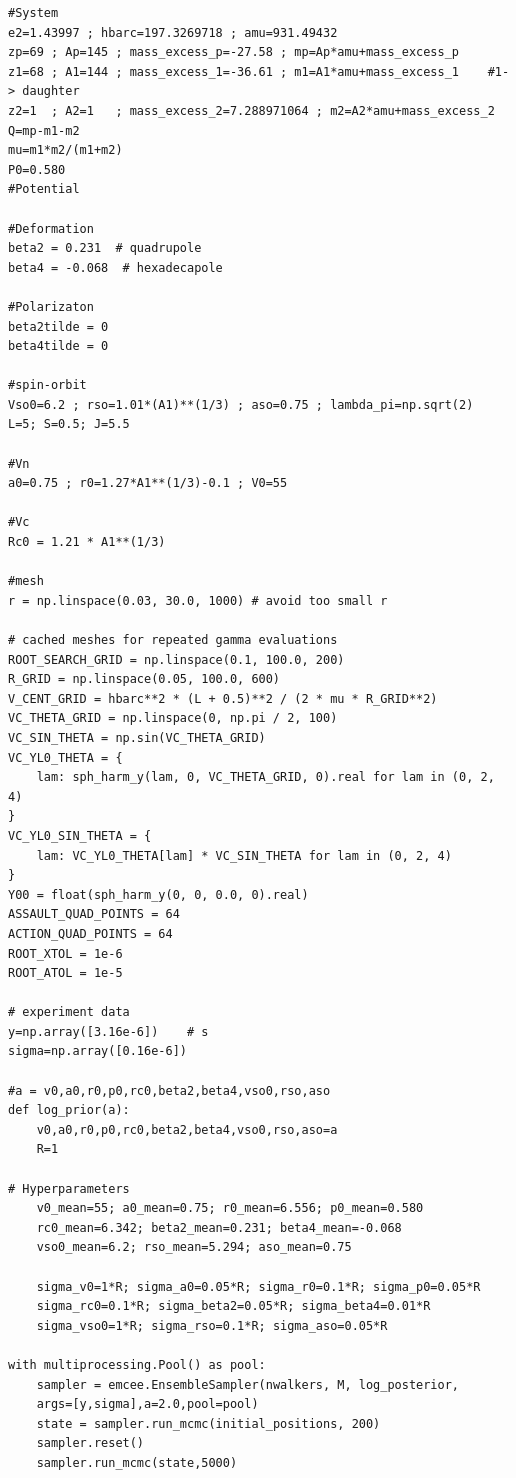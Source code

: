 \documentclass[11pt,a4paper,UTF8,scheme=plain,fontset=fandol]{ctexbook}
\theoremstyle{definition}
\theoremstyle{plain}
\theoremstyle{remark}
\begin{document}
\begin{verbatim}
#System
e2=1.43997 ; hbarc=197.3269718 ; amu=931.49432
zp=69 ; Ap=145 ; mass_excess_p=-27.58 ; mp=Ap*amu+mass_excess_p
z1=68 ; A1=144 ; mass_excess_1=-36.61 ; m1=A1*amu+mass_excess_1    #1-> daughter
z2=1  ; A2=1   ; mass_excess_2=7.288971064 ; m2=A2*amu+mass_excess_2
Q=mp-m1-m2
mu=m1*m2/(m1+m2)
P0=0.580
#Potential

#Deformation
beta2 = 0.231  # quadrupole
beta4 = -0.068  # hexadecapole 

#Polarizaton
beta2tilde = 0  
beta4tilde = 0

#spin-orbit
Vso0=6.2 ; rso=1.01*(A1)**(1/3) ; aso=0.75 ; lambda_pi=np.sqrt(2)
L=5; S=0.5; J=5.5

#Vn
a0=0.75 ; r0=1.27*A1**(1/3)-0.1 ; V0=55

#Vc
Rc0 = 1.21 * A1**(1/3)          

#mesh
r = np.linspace(0.03, 30.0, 1000) # avoid too small r

# cached meshes for repeated gamma evaluations
ROOT_SEARCH_GRID = np.linspace(0.1, 100.0, 200)
R_GRID = np.linspace(0.05, 100.0, 600)
V_CENT_GRID = hbarc**2 * (L + 0.5)**2 / (2 * mu * R_GRID**2)
VC_THETA_GRID = np.linspace(0, np.pi / 2, 100)
VC_SIN_THETA = np.sin(VC_THETA_GRID)
VC_YL0_THETA = {
    lam: sph_harm_y(lam, 0, VC_THETA_GRID, 0).real for lam in (0, 2, 4)
}
VC_YL0_SIN_THETA = {
    lam: VC_YL0_THETA[lam] * VC_SIN_THETA for lam in (0, 2, 4)
}
Y00 = float(sph_harm_y(0, 0, 0.0, 0).real)
ASSAULT_QUAD_POINTS = 64
ACTION_QUAD_POINTS = 64
ROOT_XTOL = 1e-6
ROOT_ATOL = 1e-5

# experiment data
y=np.array([3.16e-6])    # s
sigma=np.array([0.16e-6])

#a = v0,a0,r0,p0,rc0,beta2,beta4,vso0,rso,aso
def log_prior(a):
    v0,a0,r0,p0,rc0,beta2,beta4,vso0,rso,aso=a
    R=1
    
# Hyperparameters
    v0_mean=55; a0_mean=0.75; r0_mean=6.556; p0_mean=0.580
    rc0_mean=6.342; beta2_mean=0.231; beta4_mean=-0.068
    vso0_mean=6.2; rso_mean=5.294; aso_mean=0.75
    
    sigma_v0=1*R; sigma_a0=0.05*R; sigma_r0=0.1*R; sigma_p0=0.05*R
    sigma_rc0=0.1*R; sigma_beta2=0.05*R; sigma_beta4=0.01*R
    sigma_vso0=1*R; sigma_rso=0.1*R; sigma_aso=0.05*R

with multiprocessing.Pool() as pool:
    sampler = emcee.EnsembleSampler(nwalkers, M, log_posterior, 
    args=[y,sigma],a=2.0,pool=pool)
    state = sampler.run_mcmc(initial_positions, 200)
    sampler.reset()
    sampler.run_mcmc(state,5000)
\end{verbatim}
\end{document}
